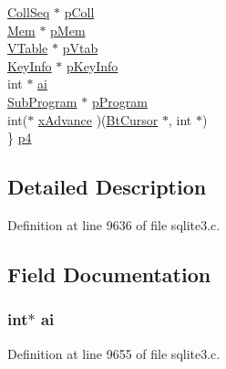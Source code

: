 \begin{DoxyCompactItemize}
\begin{tabbing}
\>\hyperlink{struct_coll_seq}{CollSeq} $\ast$ \hyperlink{struct_vdbe_op_a8123527b75f87bda58e96edcbe7438c8}{pColl}\\
\>\hyperlink{struct_mem}{Mem} $\ast$ \hyperlink{struct_vdbe_op_a7635916f8de63cb13cfe0579469bb583}{pMem}\\
\>\hyperlink{struct_v_table}{VTable} $\ast$ \hyperlink{struct_vdbe_op_ac419881f4d817f9a40325e751a0a0469}{pVtab}\\
\>\hyperlink{struct_key_info}{KeyInfo} $\ast$ \hyperlink{struct_vdbe_op_a2394c1e8402fe40753205256757b4165}{pKeyInfo}\\
\>int $\ast$ \hyperlink{struct_vdbe_op_a0d09f400edaf9f13f457142c9918d157}{ai}\\
\>\hyperlink{struct_sub_program}{SubProgram} $\ast$ \hyperlink{struct_vdbe_op_a3b92cb4ee986d1dfaf28a5ade854311c}{pProgram}\\
\>int($\ast$ \hyperlink{struct_vdbe_op_aa51062f00c915bc5cea5870763948c31}{xAdvance} )(\hyperlink{struct_bt_cursor}{BtCursor} $\ast$, int $\ast$)\\
\} \hyperlink{struct_vdbe_op_acb5afc7054dbd94bb7d43e223c1f3ff4}{p4}\\

\end{tabbing}\end{DoxyCompactItemize}


\subsection{Detailed Description}


Definition at line 9636 of file sqlite3.\+c.



\subsection{Field Documentation}
\hypertarget{struct_vdbe_op_a0d09f400edaf9f13f457142c9918d157}{}
\subsubsection[{ai}]{\setlength{\rightskip}{0pt plus 5cm}int$\ast$ ai}\label{struct_vdbe_op_a0d09f400edaf9f13f457142c9918d157}


Definition at line 9655 of file sqlite3.\+c.

\hypertarget{struct_vdbe_op_acb559820d9ca11295b4500f179ef6392}{}
